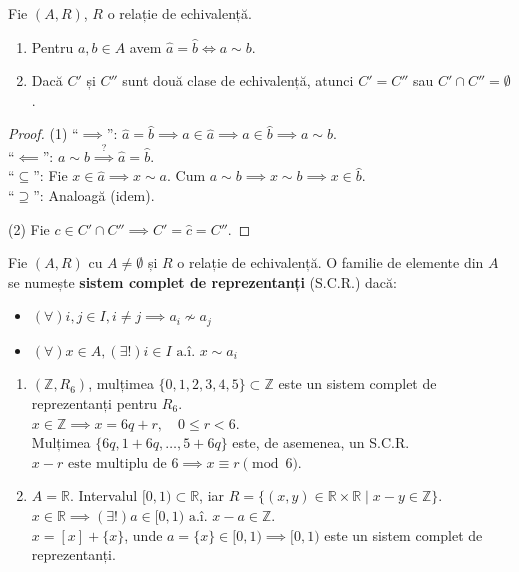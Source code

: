 \begin{proposition}
Fie $(A, R)$, $R$ o relație de echivalență.
\begin{enumerate}
    \item Pentru $a, b \in A$ avem $\hat{a} = \hat{b} \iff a \sim b$.
    \item Dacă $C'$ și $C''$ sunt două clase de echivalență, atunci $C' = C''$ sau $C' \cap C'' = \emptyset$.
\end{enumerate}
\end{proposition}

\begin{proof}
(1)
``$\implies$'': $\hat{a} = \hat{b} \implies a \in \hat{a} \implies a \in \hat{b} \implies a \sim b$. \\
``$\impliedby$'': $a \sim b \overset{?}{\implies} \hat{a} = \hat{b}$. \\
``$\subseteq$'': Fie $x \in \hat{a} \implies x \sim a$. Cum $a \sim b \implies x \sim b \implies x \in \hat{b}$. \\
``$\supseteq$'': Analoagă (idem).

(2) Fie $c \in C' \cap C'' \implies C' = \hat{c} = C''$.
\end{proof}

\begin{definition}
Fie $(A, R)$ cu $A \neq \emptyset$ și $R$ o relație de echivalență. O familie de elemente din $A$ se numește \textbf{sistem complet de reprezentanți} (S.C.R.) dacă:
\begin{itemize}
    \item[$(\alpha)$] $(\forall) i, j \in I, i \neq j \implies a_i \not\sim a_j$
    \item[$(\beta)$] $(\forall) x \in A, (\exists!) i \in I \text{ a.î. } x \sim a_i$
\end{itemize}
\end{definition}

\begin{example}\leavevmode
\begin{enumerate}
    \item $(\mathbb{Z}, R_6)$, mulțimea $\{0, 1, 2, 3, 4, 5\} \subset \mathbb{Z}$ este un sistem complet de reprezentanți pentru $R_6$. \\
    $x \in \mathbb{Z} \implies x = 6q + r, \quad 0 \leq r < 6$. \\
    Mulțimea $\{6q, 1+6q, \dots, 5+6q\}$ este, de asemenea, un S.C.R. \\
    $x - r \text{ este multiplu de } 6 \implies x \equiv r \pmod 6$.
    \item $A = \mathbb{R}$. Intervalul $[0, 1) \subset \mathbb{R}$, iar $R = \{(x, y) \in \mathbb{R} \times \mathbb{R} \mid x - y \in \mathbb{Z}\}$. \\
    $x \in \mathbb{R} \implies (\exists!) a \in [0, 1) \text{ a.î. } x - a \in \mathbb{Z}$. \\
    $x = [x] + \{x\}$, unde $a = \{x\} \in [0, 1) \implies [0, 1)$ este un sistem complet de reprezentanți.
\end{enumerate}
\end{example}

